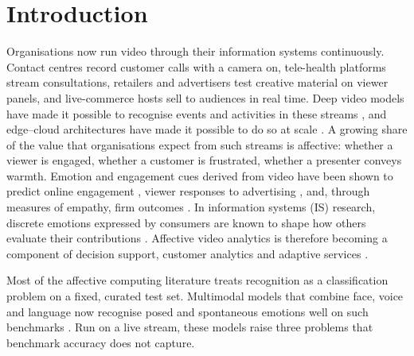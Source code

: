 \section{Introduction}\label{sec:intro}

Organisations now run video through their information systems continuously. Contact centres record customer calls with a camera on, tele-health platforms stream consultations, retailers and advertisers test creative material on viewer panels, and live-commerce hosts sell to audiences in real time. Deep video models have made it possible to recognise events and activities in these streams \citep{mao2024}, and edge--cloud architectures have made it possible to do so at scale \citep{ananthanarayanan2017,gong2025}. A growing share of the value that organisations expect from such streams is affective: whether a viewer is engaged, whether a customer is frustrated, whether a presenter conveys warmth. Emotion and engagement cues derived from video have been shown to predict online engagement \citep{stappen2022}, viewer responses to advertising \citep{antonov2024}, and, through measures of empathy, firm outcomes \citep{cui2025}. In information systems (IS) research, discrete emotions expressed by consumers are known to shape how others evaluate their contributions \citep{yin2014}. Affective video analytics is therefore becoming a component of decision support, customer analytics and adaptive services \citep{picard1997,poria2017}.

Most of the affective computing literature treats recognition as a classification problem on a fixed, curated test set. Multimodal models that combine face, voice and language now recognise posed and spontaneous emotions well on such benchmarks \citep{tzirakis2017,zadeh2017,tsai2019,wagner2023}. Run on a live stream, these models raise three problems that benchmark accuracy does not capture.

